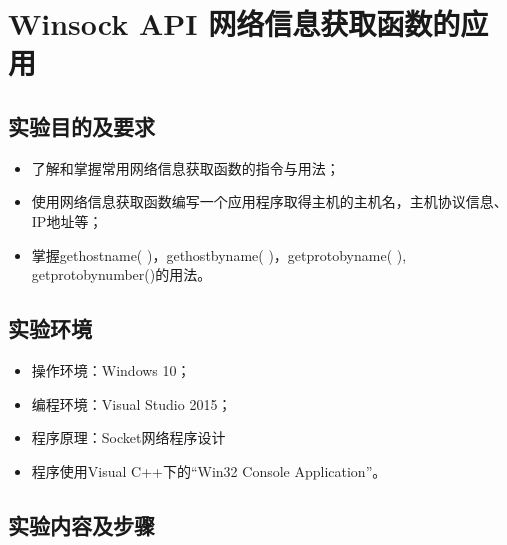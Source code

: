 \documentclass[a4paper]{ctexrep}
\begin{document}
\chapter{Winsock API 网络信息获取函数的应用}
\begin{spacing}{1.5}
\songti{}
\section{实验目的及要求}
\begin{itemize}
	\item 了解和掌握常用网络信息获取函数的指令与用法；
	\item 使用网络信息获取函数编写一个应用程序取得主机的主机名，主机协议信息、IP地址等；
	\item 掌握gethostname( )，gethostbyname( )，getprotobyname( ), getprotobynumber()的用法。
\end{itemize}
\section{实验环境}
\begin{itemize}
	\item 操作环境：Windows 10；
	\item 编程环境：Visual Studio 2015；
	\item 程序原理：Socket网络程序设计
	\item 程序使用Visual C++下的“Win32 Console Application”。
\end{itemize}
\section{实验内容及步骤}

\end{spacing}
\end{document}
